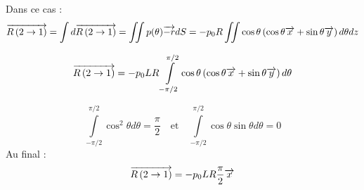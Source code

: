 \documentclass[10pt]{article}
\begin{document}
{\begin{corrige}
Dans ce cas : 
$$
\overrightarrow{R\left( {2} \rightarrow {1}\right)} = \int d\overrightarrow{R\left( {2} \rightarrow {1}\right)} = \iint p(\theta) \overrightarrow{-r} dS 
= - p_0R\iint\cos\theta  \left(\cos\theta\overrightarrow{x}+\sin\theta\overrightarrow{y} \right)  d\theta dz$$

$$
\overrightarrow{R\left( {2} \rightarrow {1}\right)} 
= - p_0 L R\int\limits_{-\pi/2}^{\pi/2}\cos\theta  \left(\cos\theta\overrightarrow{x}+\sin\theta\overrightarrow{y} \right)  d\theta$$

$$
\int\limits_{-\pi/2}^{\pi/2}\cos^2\theta  d\theta = \dfrac{\pi}{2}
\quad 
\text{et}
\quad
\int\limits_{-\pi/2}^{\pi/2}\cos\theta \sin\theta  d\theta = 0
$$
Au final :
$$
\overrightarrow{R\left( {2} \rightarrow {1}\right)} 
= - p_0 L R \dfrac{\pi}{2}\overrightarrow{x}$$
\end{corrige}}{}
\end{document}
